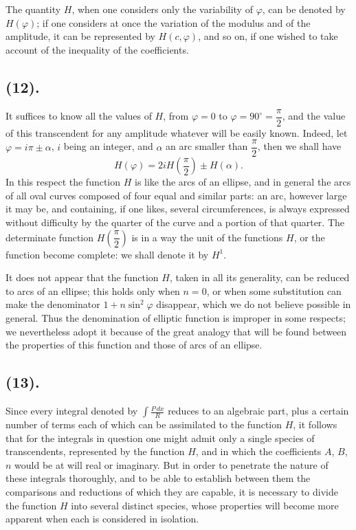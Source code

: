 \documentclass{article}
\begin{document}
The quantity $H$, when one considers only the variability of $\varphi$, can be denoted by $H(\varphi)$; if one considers at once the variation of the modulus and of the amplitude, it can be represented by $H(c,\varphi)$, and so on, if one wished to take account of the inequality of the coefficients.

\subsection*{(12).}

It suffices to know all the values of $H$, from $\varphi=0$ to $\varphi=90^{\circ}=\dfrac{\pi}{2}$, and the value of this transcendent for any amplitude whatever will be easily known. Indeed, let $\varphi=i\pi\pm\alpha$, $i$ being an integer, and $\alpha$ an arc smaller than $\dfrac{\pi}{2}$, then we shall have
\[ H(\varphi)=2iH\left(\frac{\pi}{2}\right)\pm H(\alpha). \]
In this respect the function $H$ is like the arcs of an ellipse, and in general the arcs of all oval curves composed of four equal and similar parts: an arc, however large it may be, and containing, if one likes, several circumferences, is always expressed without difficulty by the quarter of the curve and a portion of that quarter. The determinate function $H\left(\dfrac{\pi}{2}\right)$ is in a way the unit of the functions $H$, or the function become complete: we shall denote it by $H^{1}$.

It does not appear that the function $H$, taken in all its generality, can be reduced to arcs of an ellipse; this holds only when $n=0$, or when some substitution can make the denominator $1+n\sin^{2}\varphi$ disappear, which we do not believe possible in general. Thus the denomination of elliptic function is improper in some respects; we nevertheless adopt it because of the great analogy that will be found between the properties of this function and those of arcs of an ellipse.


\subsection*{(13).}

Since every integral denoted by $\displaystyle\int\frac{P\,dx}{R}$ reduces to an algebraic part, plus a certain number of terms each of which can be assimilated to the function $H$, it follows that for the integrals in question one might admit only a single species of transcendents, represented by the function $H$, and in which the coefficients $A$, $B$, $n$ would be at will real or imaginary. But in order to penetrate the nature of these integrals thoroughly, and to be able to establish between them the comparisons and reductions of which they are capable, it is necessary to divide the function $H$ into several distinct species, whose properties will become more apparent when each is considered in isolation.
\end{document}

